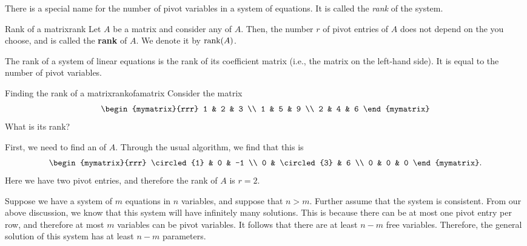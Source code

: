 There is a special name for the number of pivot variables in a system
of equations. It is called the {\em rank} of the system.

\begin{definition}{Rank of a matrix}{rank}
  Let $A$ be a matrix and consider any {\ef} of $A$.  Then, the number
  $r$ of pivot entries of $A$ does not depend on the {\ef} you choose,
  and is called the \textbf{rank} of $A$. We denote
  it by $\mbox{rank}(A)$.

  The rank of a system of linear equations is the rank of its
  coefficient matrix (i.e., the matrix on the left-hand side).
  It is equal to the number of pivot variables.
\end{definition}

\begin{example}{Finding the rank of a matrix}{rankofamatrix}
Consider the matrix
\begin{equation*}
\begin{mymatrix}{rrr}
1 & 2 & 3 \\
1 & 5 & 9 \\
2 & 4 & 6 
\end{mymatrix}
\end{equation*}
What is its rank?
\end{example}

\begin{solution}
  First, we need to find an {\ef} of $A$. Through the usual algorithm,
  we find that this is
  \begin{equation*}
    \begin{mymatrix}{rrr}
      \circled{1} & 0 & -1 \\
      0 & \circled{3} & 6 \\
      0 & 0 & 0
    \end{mymatrix}.
  \end{equation*}
  Here we have two pivot entries, and therefore the rank of $A$ is
  $r=2$.
\end{solution}

Suppose we have a system of $m$ equations in $n$ variables, and
suppose that $n>m$. Further assume that the system is consistent. From
our above discussion, we know that this system will have infinitely
many solutions. This is because there can be at most one pivot entry
per row, and therefore at most $m$ variables can be pivot
variables. It follows that there are at least $n-m$ free variables.
Therefore, the general solution of this system has at least $n-m$
parameters.

